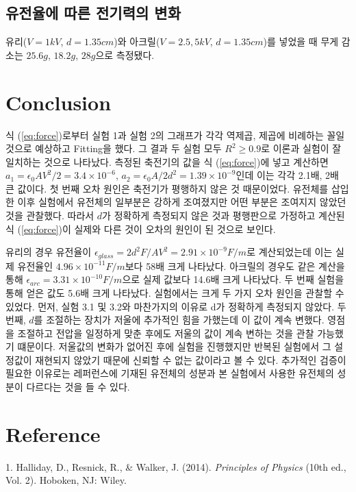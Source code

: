 \documentclass[a4paper, 8pt]{article}
\begin{document}
	\subsection{유전율에 따른 전기력의 변화}
	유리($V=1\si{kV}$, $d=1.35{cm}$)와 아크릴($V=2.5, 5\si{kV}$, $d=1.35\si{cm}$)를 넣었을 때 무게 감소는 $25.6\si{g}$, $18.2\si{g}$, $28\si{g}$으로 측정됐다.

\newpage

\section{Conclusion}
	식 (\ref{eq:force})로부터 실험 1과 실험 2의 그래프가 각각 역제곱, 제곱에 비례하는 꼴일 것으로 예상하고 Fitting을 했다.
	그 결과 두 실험 모두 $R^2\ge0.9$로 이론과 실험이 잘 일치하는 것으로 나타났다.
	측정된 축전기의 값을 식 (\ref{eq:force})에 넣고 계산하면 
	$a_1=\epsilon{}_0AV^{2}/2=3.4\times10^{-6}$, $a_2=\epsilon{}_0A/2d^2=1.39\times10^{-9}$인데 이는 각각 2.1배, 2배 큰 값이다. 첫 번째 오차 원인은 축전기가 평행하지 않은 것 때문이었다. 
	유전체를 삽입한 이후 실험에서 유전체의 일부분은 강하게 조여졌지만 어떤 부분은 조여지지 않았던 것을 관찰했다. 따라서 $d$가 정확하게 측정되지 않은 것과 평행판으로 가정하고 계산된 식 (\ref{eq:force})이 실제와 다른 것이 오차의 원인이 된 것으로 보인다.

	유리의 경우 유전율이 $\epsilon{}_{glass}=2d^2F/AV^2=2.91\times10^{-9}\si{F/m}$로 계산되었는데 이는 실제 유전율인 $4.96\times10^{-11}\si{F/m}$보다 58배 크게 나타났다. 
	아크릴의 경우도 같은 계산을 통해 $\epsilon{}_{arc}=3.31\times10^{-10}\si{F/m}$으로 실제 값보다 14.6배 크게 나타났다. 
	두 번째 실험을 통해 얻은 값도 5.6배 크게 나타났다.
	실험에서는 크게 두 가지 오차 원인을 관찰할 수 있었다.
	먼저, 실험 3.1 및 3.2와 마찬가지의 이유로 d가 정확하게 측정되지 않았다.
	두 번째, $d$를 조절하는 장치가 저울에 추가적인 힘을 가했는데 이 값이 계속 변했다.
	영점을 조절하고 전압을 일정하게 맞춘 후에도 저울의 값이 계속 변하는 것을 관찰 가능했기 떄문이다.
	저울값의 변화가 없어진 후에 실험을 진행했지만 반복된 실험에서 그 설정값이 재현되지 않았기 때문에 신뢰할 수 없는 값이라고 볼 수 있다.
	추가적인 검증이 필요한 이유로는 레퍼런스에 기재된 유전체의 성분과 본 실험에서 사용한 유전체의 성분이 다르다는 것을 들 수 있다.  




	 
	
\section{Reference}
	1. Halliday, D., Resnick, R., \& Walker, J. (2014). {\it{}Principles of Physics} (10th ed., Vol. 2). Hoboken, NJ: Wiley. 
\end{document}
